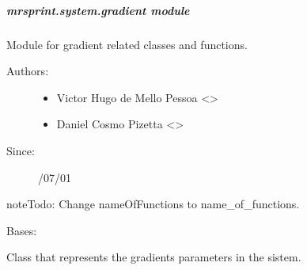 \documentclass[a4paper,10pt,english]{sphinxmanual}
\begin{document}
\subparagraph{mrsprint.system.gradient module}
\label{\detokenize{autodoc/mrsprint/mrsprint.system:module-mrsprint.system.gradient}}\label{\detokenize{autodoc/mrsprint/mrsprint.system:mrsprint-system-gradient-module}}
Module for gradient related classes and functions.
\begin{description}
\item[{Authors:}] \leavevmode\begin{itemize}
\item {} 
Victor Hugo de Mello Pessoa \textless{}\textgreater{}

\item {} 
Daniel Cosmo Pizetta \textless{}\textgreater{}

\end{itemize}

\item[{Since:}] /07/01

\end{description}

\begin{sphinxadmonition}{note}{\label{autodoc/mrsprint/mrsprint.system:index-0}Todo:}
Change nameOfFunctions to name\_of\_functions.
\end{sphinxadmonition}

\begin{fulllineitems}
\label{\detokenize{autodoc/mrsprint/mrsprint.system:mrsprint.system.gradient.Gradient}}
Bases: 

Class that represents the gradients parameters in the sistem.

\end{fulllineitems}

\end{document}
